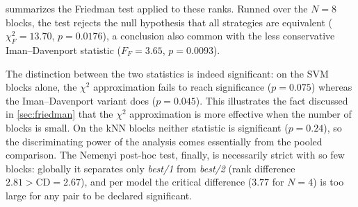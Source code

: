 \documentclass[12pt, openany]{article}
\begin{document}
 summarizes the Friedman test applied to these ranks. Runned over the $N=8$ blocks, the test rejects the null hypothesis that all strategies are equivalent ($\chi_F^2 = 13.70$, $p = 0.0176$), a conclusion also common with the less conservative Iman--Davenport statistic ($F_F = 3.65$, $p = 0.0093$).

The distinction between the two statistics is indeed significant: on the SVM blocks alone, the $\chi^2$ approximation fails to reach significance ($p = 0.075$) whereas the Iman--Davenport variant does ($p = 0.045$). This illustrates the fact discussed in \ref{sec:friedman} that the $\chi^2$ approximation is more effective when the number of blocks is small. On the kNN blocks neither statistic is significant ($p = 0.24$), so the discriminating power of the analysis comes essentially from the pooled comparison. The Nemenyi post-hoc test, finally, is necessarily strict with so few blocks: globally it separates only \textit{best/1} from \textit{best/2} (rank difference $2.81 > \mathrm{CD} = 2.67$), and per model the critical difference ($3.77$ for $N=4$) is too large for any pair to be declared significant.


\begin{table}[H]
    \centering
    \renewcommand{\arraystretch}{1.3}
    \caption{\centering\textbf{Summary of statistical significance tests for mutation strategies.} Statistically significant $p$-values ($<0.05$) are highlighted in bold. The Critical Difference (CD) dictates the threshold for Nemenyi pairwise significance.}
    \label{tab:statistical_tests_bde}
\end{table}
\end{document}
